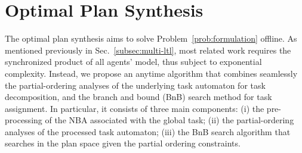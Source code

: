 \section{Optimal Plan Synthesis}\label{subsec:initial-synthesis}
The optimal plan synthesis aims to solve Problem~\ref{prob:formulation} offline.
As mentioned previously in Sec.~\ref{subsec:multi-ltl},
most related work requires the synchronized product of all agents' model,
thus subject to exponential complexity.
Instead, we propose an anytime algorithm that combines seamlessly the partial-ordering analyses
of the underlying task automaton for task decomposition,
and the branch and bound (BnB) search method for task assignment.
In particular, it consists of three main components:
(i) the pre-processing of the NBA associated with the global task;
(ii) the partial-ordering analyses of the processed task automaton;
(iii) the BnB search algorithm that searches in the plan space
given the partial ordering constraints.
